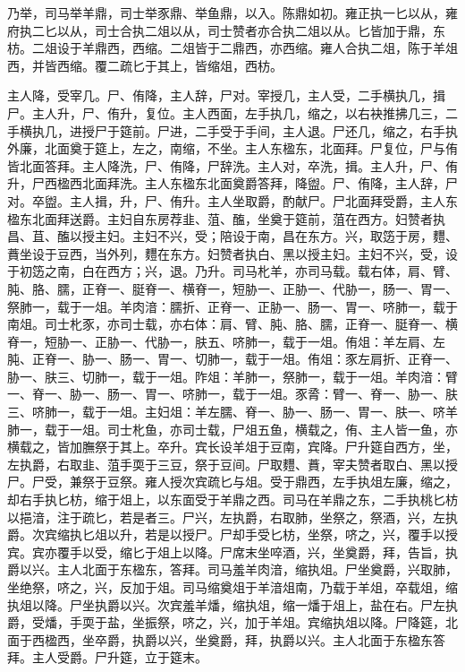 \documentclass[]{article}
\begin{document}
乃举，司马举羊鼎，司士举豕鼎、举鱼鼎，以入。陈鼎如初。雍正执一匕以从，雍府执二匕以从，司士合执二俎以从，司士赞者亦合执二俎以从。匕皆加于鼎，东枋。二俎设于羊鼎西，西缩。二俎皆于二鼎西，亦西缩。雍人合执二俎，陈于羊俎西，并皆西缩。覆二疏匕于其上，皆缩俎，西枋。

主人降，受宰几。尸、侑降，主人辞，尸对。宰授几，主人受，二手横执几，揖尸。主人升，尸、侑升，复位。主人西面，左手执几，缩之，以右袂推拂几三，二手横执几，进授尸于筵前。尸进，二手受于手间，主人退。尸还几，缩之，右手执外廉，北面奠于筵上，左之，南缩，不坐。主人东楹东，北面拜。尸复位，尸与侑皆北面答拜。主人降洗，尸、侑降，尸辞洗。主人对，卒洗，揖。主人升，尸、侑升，尸西楹西北面拜洗。主人东楹东北面奠爵答拜，降盥。尸、侑降，主人辞，尸对。卒盥。主人揖，升，尸、侑升。主人坐取爵，酌献尸。尸北面拜受爵，主人东楹东北面拜送爵。主妇自东房荐韭、菹、醢，坐奠于筵前，菹在西方。妇赞者执昌、苴、醢以授主妇。主妇不兴，受；陪设于南，昌在东方。兴，取笾于房，麷、蕡坐设于豆西，当外列，麷在东方。妇赞者执白、黑以授主妇。主妇不兴，受，设于初笾之南，白在西方；兴，退。乃升。司马朼羊，亦司马载。载右体，肩、臂、肫、胳、臑，正脊一、脡脊一、横脊一，短胁一、正胁一、代胁一，肠一、胃一、祭肺一，载于一俎。羊肉湆：臑折、正脊一、正胁一、肠一、胃一、哜肺一，载于南俎。司士朼豕，亦司士载，亦右体：肩、臂、肫、胳、臑，正脊一、脡脊一、横脊一，短胁一、正胁一、代胁一，肤五、哜肺一，载于一俎。侑俎：羊左肩、左肫、正脊一、胁一、肠一、胃一、切肺一，载于一俎。侑俎：豕左肩折、正脊一、胁一、肤三、切肺一，载于一俎。阼俎：羊肺一，祭肺一，载于一俎。羊肉湆：臂一、脊一、胁一、肠一、胃一、哜肺一，载于一俎。豕脀：臂一、脊一、胁一、肤三、哜肺一，载于一俎。主妇俎：羊左臑、脊一、胁一、肠一、胃一、肤一、哜羊肺一，载于一俎。司士朼鱼，亦司士载，尸俎五鱼，横载之，侑、主人皆一鱼，亦横载之，皆加膴祭于其上。卒升。宾长设羊俎于豆南，宾降。尸升筵自西方，坐，左执爵，右取韭、菹手耎于三豆，祭于豆间。尸取麷、蕡，宰夫赞者取白、黑以授尸。尸受，兼祭于豆祭。雍人授次宾疏匕与俎。受于鼎西，左手执俎左廉，缩之，却右手执匕枋，缩于俎上，以东面受于羊鼎之西。司马在羊鼎之东，二手执桃匕枋以挹湆，注于疏匕，若是者三。尸兴，左执爵，右取肺，坐祭之，祭酒，兴，左执爵。次宾缩执匕俎以升，若是以授尸。尸却手受匕枋，坐祭，哜之，兴，覆手以授宾。宾亦覆手以受，缩匕于俎上以降。尸席末坐啐酒，兴，坐奠爵，拜，告旨，执爵以兴。主人北面于东楹东，答拜。司马羞羊肉湆，缩执俎。尸坐奠爵，兴取肺，坐绝祭，哜之，兴，反加于俎。司马缩奠俎于羊湆俎南，乃载于羊俎，卒载俎，缩执俎以降。尸坐执爵以兴。次宾羞羊燔，缩执俎，缩一燔于俎上，盐在右。尸左执爵，受燔，手耎于盐，坐振祭，哜之，兴，加于羊俎。宾缩执俎以降。尸降筵，北面于西楹西，坐卒爵，执爵以兴，坐奠爵，拜，执爵以兴。主人北面于东楹东答拜。主人受爵。尸升筵，立于筵末。
\end{document}
